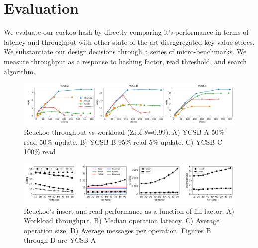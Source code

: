 \section{Evaluation}
\label{sec:eval}

We evaluate our cuckoo hash by directly comparing it's
performance in terms of latency and throughput with other
state of the art disaggregated key value stores. We
substantiate our design decisions through a series of
micro-benchmarks. We measure throughput as a response to
hashing factor, read threshold, and search algorithm.

\begin{figure}[ht]
    \includegraphics[width=0.99\linewidth]{fig/hero_ycsb_throughput.pdf}

    \caption{Rcuckoo throughput vs workload (Zipf $\theta$=0.99). A) YCSB-A 50\%
    read 50\% update. B) YCSB-B 95\% read 5\% update. C)
    YCSB-C 100\% read}
    \label{fig:ycsb_throughput}
 \end{figure}

\begin{figure}[ht]
    \includegraphics[width=0.99\linewidth]{fig/hero_ycsb_fill.pdf}

    \caption{Rcuckoo's insert and read performance as a
    function of fill factor. A) Workload throughput. B)
    Median operation latency. C) Average operation size. D)
    Average messages per operation. Figures B through D are
    YCSB-A }

    \label{fig:ycsb_fill}
\end{figure}


